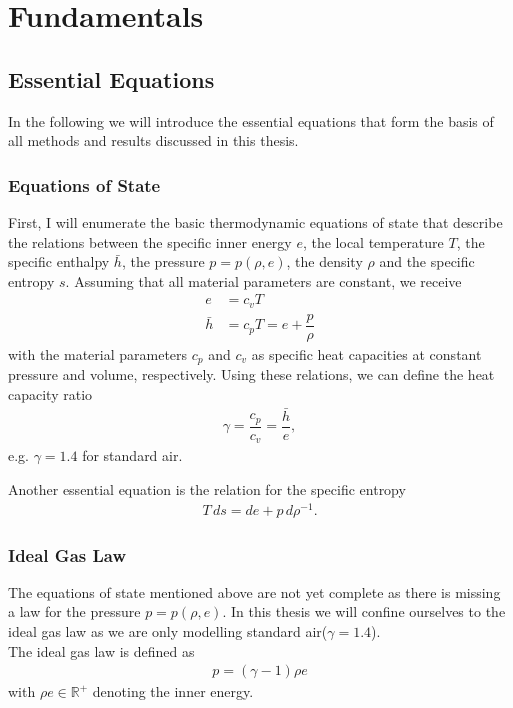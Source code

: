 \chapter{Fundamentals}
\label{fundamentals}
	\section{Essential Equations}
		In the following we will introduce the essential equations that form the basis of all methods and results discussed in this thesis. 
		\subsection{Equations of State}
		\label{EOS}
		First, I will enumerate the basic thermodynamic equations of state that describe the relations between the specific inner energy $e$, the local temperature $T$, the specific enthalpy $\bar{h}$, the pressure $p = p (\rho , e)$, the density $\rho$ and the specific entropy $s$.
		Assuming that all material parameters are constant, we receive
		\begin{align}
			e &= c_v T \\
			\bar{h} &= c_p T = e + \dfrac{p}{\rho}
		\end{align}
		with the material parameters $c_p$ and $c_v$ as specific heat capacities at constant pressure and volume, respectively. Using these relations, we can define the heat capacity ratio 
		\begin{align}
			\gamma = \dfrac{c_p}{c_v} = \dfrac{\bar{h}}{e}, 
		\end{align}
		e.g. $\gamma = 1.4$ for standard air.
		
		Another essential equation is the relation for the specific entropy 
		\begin{align}
			T \, ds = de + p \, d\rho^{-1}.
		\end{align}
		
		\subsection{Ideal Gas Law}
		The equations of state mentioned above are not yet complete as there is missing a law for the pressure $p = p (\rho , e)$. In this thesis we will confine ourselves to the ideal gas law as we are only modelling standard air($\gamma = 1.4$). \\
		The ideal gas law is defined as
		\begin{align}
			p = (\gamma - 1) \rho e
		\end{align}
		with $\rho e \in \mathbb{R}^+$ denoting the inner energy. \\
		
